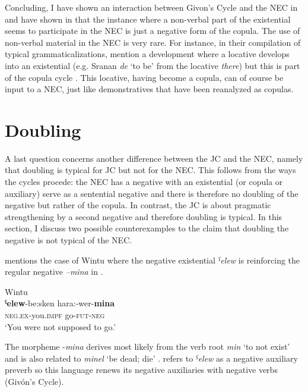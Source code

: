 ﻿\documentclass[output=paper]{langsci/langscibook}
\begin{document}
Concluding, I have shown an interaction between Givon's Cycle and the NEC
in  and have shown in  that the
instance where a non-verbal part of the existential seems to participate in
the NEC is just a negative form of the copula. The use of non-verbal
material in the NEC is very rare.  For instance, in their compilation of
typical grammaticalizations, \citet[199--206]{HeineKuteva2002} mention a
development where a locative develops into an existential (e.g.
Sranan \textit{de} `to be' from the locative \textit{there}) but
this is part of the copula cycle \parencite{Gelderen2015}. This locative,
having become a copula, can of course be input to a NEC, just like
demonstratives that have been reanalyzed as copulas.

\section{Doubling}\label{sec:oth-4}

A last question concerns another difference between the JC and the NEC,
namely that doubling is typical for JC but not for the NEC. This follows
from the ways the cycles procede: the NEC has a negative with an
existential (or copula or auxiliary) serve as a sentential negative and
there is therefore no doubling of the negative but rather of the copula. In
contrast, the JC is about pragmatic strengthening by a second negative and
therefore doubling is typical. In this section, I discuss two possible
counterexamples to the claim that doubling the negative is not typical of
the NEC.

\citet[10]{Croft1991} mentions the case of Wintu where the
negative existential \textit{ˁelew} is reinforcing the regular negative
\textit{–mina} in . 

\begin{exe}\ex Wintu \label{ex:other-wintu-go}\\
    \gll \textbf{ˁelew}-be:sken    hara:-wer-\textbf{mina} \\
  \textsc{neg.ex}-you.\textsc{impf}  go-\textsc{fut-neg} \\
    \glt `You were not supposed to go.' \citep[198]{Pitkin1984}
    \end{exe}
%
The morpheme -\textit{mina} derives most likely from the verb root
\textit{min} `to not exist'
\parencites[361]{Schlichter1981}[121]{Pitkin1984} and is also related to
\textit{minel} `be dead; die' \citep[146]{Schlichter1981}.
\citet[311]{Schlichter1981} refers to \textit{ˁelew} as a negative
auxiliary preverb so this language renews its negative auxiliaries with
negative verbs (Givón's Cycle). 
\end{document}
